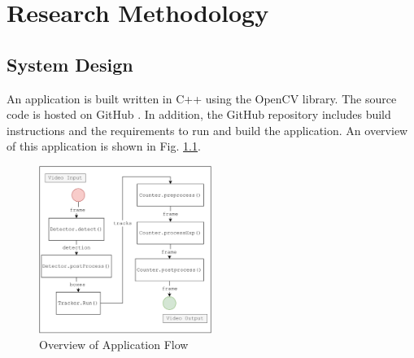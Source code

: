 \documentclass[12pt,a4paper,fleqn]{report}
\begin{document}
\chapter{Research Methodology}

\section{System Design}
An application is built written in C++ using the OpenCV library.
The source code is hosted on GitHub \cite{rvc-source:2022}. 
In addition, the GitHub repository includes build instructions and the requirements to run and build the
application. 
An overview of this application is shown in Fig. \ref{fig:systemflow}.

\begin{figure}[htbp]
    \begin{center}
        \includegraphics[width=0.5\textwidth]{figures/systemflow.png}
    \end{center}
    \caption{Overview of Application Flow}
    \label{fig:systemflow}
\end{figure}
\end{document}
